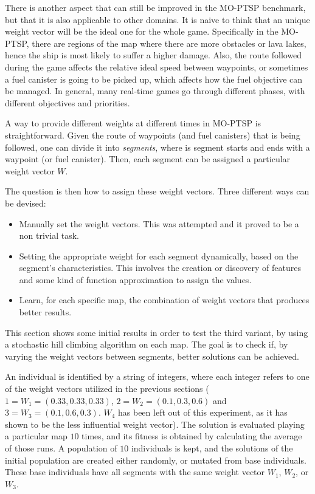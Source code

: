 \documentclass[journal]{IEEEtran}
\begin{document}
There is another aspect that can still be improved in the MO-PTSP benchmark, but that it is also applicable to other domains. It is naive to think that an unique weight vector will be the ideal one for the whole game. Specifically in the MO-PTSP, there are regions of the map where there are more obstacles or lava lakes, hence the ship is most likely to suffer a higher damage. Also, the route followed during the game affects the relative ideal speed between waypoints, or sometimes a fuel canister is going to be picked up, which affects how the fuel objective can be managed. In general, many real-time games go through different phases, with different objectives and priorities.

A way to provide different weights at different times in MO-PTSP is straightforward. Given the route of waypoints (and fuel canisters) that is being followed, one can divide it into \textit{segments}, where is segment starts and ends with a waypoint (or fuel canister). Then, each segment can be assigned a particular weight vector $W$. 

The question is then how to assign these weight vectors. Three different ways can be devised:

\begin{itemize}
\item Manually set the weight vectors. This was attempted and it proved to be a non trivial task.
\item Setting the appropriate weight for each segment dynamically, based on the segment's characteristics. This involves the creation or discovery of features and some kind of function approximation to assign the values. 
\item Learn, for each specific map, the combination of weight vectors that produces better results.
\end{itemize}

This section shows some initial results in order to test the third variant, by using a stochastic hill climbing algorithm on each map. The goal is to check if, by varying the weight vectors between segments, better solutions can be achieved. 

An individual is identified by a string of integers, where each integer refers to one of the weight vectors utilized in the previous sections ( $1 = W_1 = (0.33,0.33,0.33)$, $2 = W_2 = (0.1,0.3,0.6)$ and $3 = W_3 = (0.1,0.6,0.3)$. $W_4$ has been left out of this experiment, as it has shown to be the less influential weight vector). The solution is evaluated playing a particular map $10$ times, and its fitness is obtained by calculating the average of those runs. A population of $10$ individuals is kept, and the solutions of the initial population are created either randomly, or mutated from base individuals. These base individuals have all segments with the same weight vector $W_1$, $W_2$, or $W_3$. 
\end{document}
